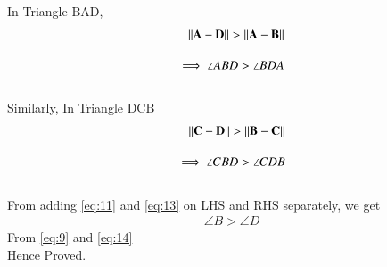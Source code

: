 \documentclass[journal,12pt,twocolumn]{IEEEtran}
\begin{document}
In Triangle BAD,
\begin{align}
\lVert\mathbf{A-D}\rVert > \lVert\mathbf{A-B}\rVert\\[1em]
\implies \angle ABD > \angle BDA \label{eq:11}
\end{align}\\
Similarly, In Triangle DCB
\begin{align}
\lVert\mathbf{C-D}\rVert > \lVert\mathbf{B-C}\rVert\\[1em]
\implies \angle CBD > \angle CDB \label{eq:13}
\end{align}\\
From adding \eqref{eq:11} and \eqref{eq:13} on LHS and RHS separately, we get
\begin{align}
    \angle B > \angle D \label{eq:14}
\end{align}
From \eqref{eq:9} and \eqref{eq:14}\\Hence Proved.
\end{document}
